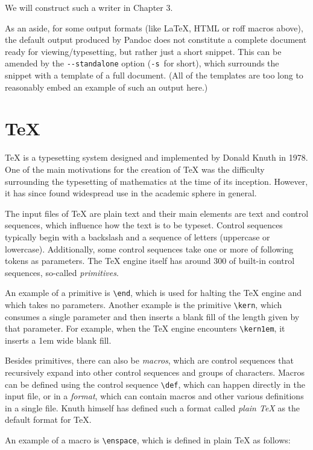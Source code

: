 \documentclass[
  digital,     %
  oneside,     %
  nosansbold,  %
  nocolorbold, %
  lof,         %
  nolot,       %
]{fithesis4}
\newcommand\macro[1]{\texttt{\textbackslash{}{#1}}}
\begin{document}
\noindent
We will construct such a writer in Chapter 3.

As an aside, for some output formats (like \LaTeX{}, HTML or roff macros above), the default output produced by Pandoc does not constitute a complete document ready for viewing/typesetting, but rather just a short snippet. This can be amended by the \texttt{-{}-standalone} option (\texttt{-s}~for short), which surrounds the snippet with a template of a full document. (All of the templates are too long to reasonably embed an example of such an output here.)

\section{\TeX{}}
\TeX{} is a typesetting system designed and implemented by Donald Knuth in 1978. One of the main motivations for the creation of \TeX{} was the difficulty surrounding the typesetting of mathematics at the time of its inception. However, it has since found widespread use in the academic sphere in general.

The input files of \TeX{} are plain text and their main elements are text and control sequences, which influence how the text is to be typeset. Control sequences typically begin with a backslash and a sequence of letters (uppercase or lowercase). Additionally, some control sequences take one or more of following tokens as parameters. The \TeX{} engine itself has around 300 of built-in control sequences, so-called \textit{primitives}.

An example of a primitive is \macro{end}, which is used for halting the \TeX{} engine and which takes no parameters. Another example is the primitive \macro{kern}, which consumes a single parameter and then inserts a blank fill of the length given by that parameter. For example, when the \TeX{} engine encounters \macro{kern1em}, it inserts a 1em wide blank fill.

Besides primitives, there can also be \textit{macros}, which are control sequences that recursively expand into other control sequences and groups of characters. Macros can be defined using the control sequence \macro{def}, which can happen directly in the input file, or in a \textit{format}, which can contain macros and other various definitions in a single file. Knuth himself has defined such a format called \textit{plain \TeX{}} as the default format for \TeX{}.

An example of a macro is \macro{enspace}, which is defined in plain \TeX{} as follows:
\end{document}
